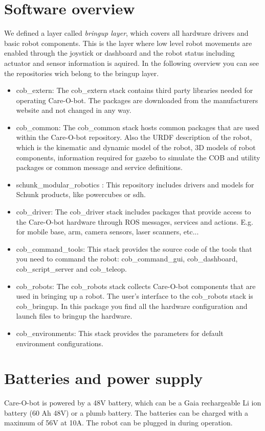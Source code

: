 \section{Software overview}
We defined a layer called \textit{bringup layer}, which covers all hardware drivers and basic robot components. This is the layer where low level robot movements are enabled through the joystick or dashboard and the robot status including actuator and sensor information is aquired. In the following overview you can see the repositories wich belong to the bringup layer.
\begin{itemize}
\item {cob\_extern}: The cob\_extern stack contains third party libraries needed for operating Care-O-bot. The packages are downloaded from the manufacturers website and not changed in any way.
\item {cob\_common}: The cob\_common stack hosts common packages that are used within the Care-O-bot repository. Also the URDF description of the robot, which is the kinematic and dynamic model of the robot, 3D models of robot components, information required for gazebo to simulate the COB and utility packages or common message and service definitions.
\item schunk\_modular\_robotics : This repository includes drivers and models for Schunk products, like powercubes or sdh.
\item cob\_driver: The cob\_driver stack includes packages that provide access to the Care-O-bot hardware through ROS messages, services and actions. E.g. for mobile base, arm, camera sensors, laser scanners, etc...
\item cob\_command\_tools: This stack provides the source code of the tools that you need to command the robot: cob\_command\_gui, cob\_dashboard, cob\_script\_server and cob\_teleop.
\item cob\_robots:  The cob\_robots stack collects Care-O-bot components that are used in bringing up a robot. The user's interface to the cob\_robots stack is cob\_bringup. In this package you find all the hardware configuration and launch files to bringup the hardware.
\item cob\_environments: This stack provides the parameters for default environment configurations.
\end{itemize}

\section{Batteries and power supply}
Care-O-bot is powered by a 48V battery, which can be a Gaia rechargeable Li ion battery (60 Ah 48V) or a plumb battery. The batteries can be charged with a maximum of 56V at 10A. The robot can be plugged in during operation.

